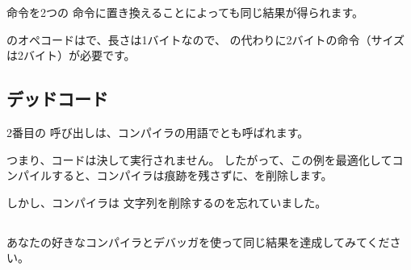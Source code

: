\JMP 命令を2つの \NOP 命令に置き換えることによっても同じ結果が得られます。

\NOP のオペコードはで、長さは1バイトなので、 \JMP の代わりに2バイトの命令（サイズは2バイト）が必要です。

\subsection{デッドコード}

2番目の \printf 呼び出しは、コンパイラの用語でとも呼ばれます。

つまり、コードは決して実行されません。
したがって、この例を最適化してコンパイルすると、コンパイラは痕跡を残さずに、を削除します。



しかし、コンパイラは 文字列を削除するのを忘れていました。


\subsection{\Exercise}


あなたの好きなコンパイラとデバッガを使って同じ結果を達成してみてください。
